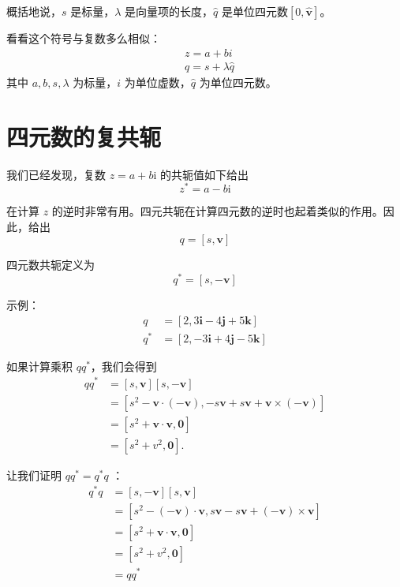 概括地说，$s$ 是标量，$\lambda$ 是向量项的长度，$\hat{q}$ 是单位四元数$[0, \hat{\mathbf{v}}]$。

看看这个符号与复数多么相似：
$$
    \begin{aligned}
         & z=a+b i             \\
         & q=s+\lambda \hat{q}
    \end{aligned}
$$
其中 $a,b,s,\lambda$ 为标量，$i$ 为单位虚数，$\hat{q}$ 为单位四元数。

\section{四元数的复共轭}
我们已经发现，复数 $z=a+b \mathrm{i}$ 的共轭值如下给出
$$
    z^{*}=a-b \mathrm{i}
$$

在计算 $z$ 的逆时非常有用。四元共轭在计算四元数的逆时也起着类似的作用。因此，给出
$$
    q=[s, \mathbf{v}]
$$

四元数共轭定义为
$$
    q^{*}=[s,-\mathbf{v}]
$$

示例：
$$
    \begin{aligned}
        q     & =[2,3 \mathbf{i}-4 \mathbf{j}+5 \mathbf{k}]  \\
        q^{*} & =[2,-3 \mathbf{i}+4 \mathbf{j}-5 \mathbf{k}]
    \end{aligned}
$$

如果计算乘积 $q q^{*}$，我们会得到
$$
    \begin{aligned}
        q q^{*} & =[s, \mathbf{v}][s,-\mathbf{v}]                                                                             \\
                & =\left[s^{2}-\mathbf{v} \cdot(-\mathbf{v}),-s \mathbf{v}+s \mathbf{v}+\mathbf{v} \times(-\mathbf{v})\right] \\
                & =\left[s^{2}+\mathbf{v} \cdot \mathbf{v}, \mathbf{0}\right]                                                 \\
                & =\left[s^{2}+v^{2}, \mathbf{0}\right] .
    \end{aligned}
$$

让我们证明 $q q^{*}=q^{*} q$ ：
$$
    \begin{aligned}
        q^{*} q & =[s,-\mathbf{v}][s, \mathbf{v}]                                                                               \\
                & =\left[s^{2}-(-\mathbf{v}) \cdot \mathbf{v}, s \mathbf{v}-s \mathbf{v}+(-\mathbf{v}) \times \mathbf{v}\right] \\
                & =\left[s^{2}+\mathbf{v} \cdot \mathbf{v}, \mathbf{0}\right]                                                   \\
                & =\left[s^{2}+v^{2}, \mathbf{0}\right]                                                                         \\
                & =q q^{*}
    \end{aligned}
$$

